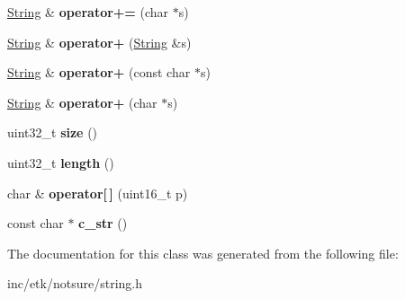 \begin{DoxyCompactItemize}
\item 
\hypertarget{classetk_1_1_string_a4501ff424413f2a6fa3bb05d809d40f2}{\hyperlink{classetk_1_1_string}{String} \& {\bfseries operator+=} (char $\ast$s)}\label{classetk_1_1_string_a4501ff424413f2a6fa3bb05d809d40f2}

\item 
\hypertarget{classetk_1_1_string_a0697471d8880d52ca56fe24e2e469288}{\hyperlink{classetk_1_1_string}{String} \& {\bfseries operator+} (\hyperlink{classetk_1_1_string}{String} \&s)}\label{classetk_1_1_string_a0697471d8880d52ca56fe24e2e469288}

\item 
\hypertarget{classetk_1_1_string_a5829089da5e87346709320dff71bedb1}{\hyperlink{classetk_1_1_string}{String} \& {\bfseries operator+} (const char $\ast$s)}\label{classetk_1_1_string_a5829089da5e87346709320dff71bedb1}

\item 
\hypertarget{classetk_1_1_string_aeae54e7785471c4f4d072547d724d743}{\hyperlink{classetk_1_1_string}{String} \& {\bfseries operator+} (char $\ast$s)}\label{classetk_1_1_string_aeae54e7785471c4f4d072547d724d743}

\item 
\hypertarget{classetk_1_1_string_abe5418c08ca459960a877007c7fc4db8}{uint32\-\_\-t {\bfseries size} ()}\label{classetk_1_1_string_abe5418c08ca459960a877007c7fc4db8}

\item 
\hypertarget{classetk_1_1_string_aaa2a63ceb0b367d6e3929c2e43bec6f6}{uint32\-\_\-t {\bfseries length} ()}\label{classetk_1_1_string_aaa2a63ceb0b367d6e3929c2e43bec6f6}

\item 
\hypertarget{classetk_1_1_string_ae058a7c1b103cb0b39c389f06dd08743}{char \& {\bfseries operator\mbox{[}$\,$\mbox{]}} (uint16\-\_\-t p)}\label{classetk_1_1_string_ae058a7c1b103cb0b39c389f06dd08743}

\item 
\hypertarget{classetk_1_1_string_a100ddc06125ca07a335de44a2b7cf332}{const char $\ast$ {\bfseries c\-\_\-str} ()}\label{classetk_1_1_string_a100ddc06125ca07a335de44a2b7cf332}

\end{DoxyCompactItemize}


The documentation for this class was generated from the following file\-:\begin{DoxyCompactItemize}
\item 
inc/etk/notsure/string.\-h\end{DoxyCompactItemize}
